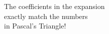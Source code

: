 \documentclass[preview]{standalone}
\begin{document}
\begin{center}
The coefficients in the expansion\\exactly match the numbers\\in Pascal's Triangle!
\end{center}
\end{document}

